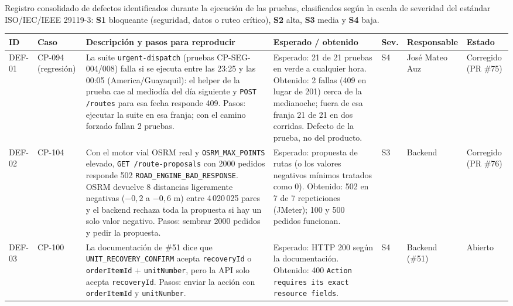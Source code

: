 Registro consolidado de defectos identificados durante la ejecución de las pruebas, clasificados
según la escala de severidad del estándar ISO/IEC/IEEE 29119-3: \textbf{S1} bloqueante
(seguridad, datos o ruteo crítico), \textbf{S2} alta, \textbf{S3} media y \textbf{S4} baja.

\begin{center}
\footnotesize
\setlength{\tabcolsep}{3pt}
\begin{longtable}{|P{1.2cm}|P{1.5cm}|P{3.6cm}|P{3.2cm}|P{0.9cm}|P{1.9cm}|P{1.6cm}|}
\hline
\textbf{ID} & \textbf{Caso} & \textbf{Descripción y pasos para reproducir} & \textbf{Esperado / obtenido} & \textbf{Sev.} & \textbf{\scriptsize Responsable} & \textbf{Estado} \\ \hline
\endhead
DEF-01 & CP-094 (regresión) & La suite \texttt{urgent-dispatch} (pruebas CP-SEG-004/008) falla si se ejecuta entre las 23:25 y las 00:05 (America/Guayaquil): el helper de la prueba cae al mediodía del día siguiente y \texttt{POST /routes} para esa fecha responde 409. Pasos: ejecutar la suite en esa franja; con el camino forzado fallan 2 pruebas. & Esperado: 21 de 21 pruebas en verde a cualquier hora. Obtenido: 2 fallas (409 en lugar de 201) cerca de la medianoche; fuera de esa franja 21 de 21 en dos corridas. Defecto de la prueba, no del producto. & S4 & José Mateo Auz & Corregido (PR \#75) \\ \hline
DEF-02 & CP-104 & Con el motor vial OSRM real y \texttt{OSRM\_MAX\_POINTS} elevado, \texttt{GET /route-proposals} con 2000 pedidos responde 502 \texttt{ROAD\_ENGINE\_BAD\_RESPONSE}. OSRM devuelve 8 distancias ligeramente negativas ($-0{,}2$ a $-0{,}6$ m) entre 4\,020\,025 pares y el backend rechaza toda la propuesta si hay un solo valor negativo. Pasos: sembrar 2000 pedidos y pedir la propuesta. & Esperado: propuesta de rutas (o los valores negativos mínimos tratados como 0). Obtenido: 502 en 7 de 7 repeticiones (JMeter); 100 y 500 pedidos funcionan. & S3 & Backend & Corregido (PR \#76) \\ \hline
DEF-03 & CP-100 & La documentación de \#51 dice que \texttt{UNIT\_RECOVERY\_CONFIRM} acepta \texttt{recoveryId} o \texttt{orderItemId} + \texttt{unitNumber}, pero la API solo acepta \texttt{recoveryId}. Pasos: enviar la acción con \texttt{orderItemId} y \texttt{unitNumber}. & Esperado: HTTP 200 según la documentación. Obtenido: 400 \texttt{Action requires its exact resource fields}. & S4 & Backend (\#51) & Abierto \\ \hline

\end{longtable}
\end{center}
